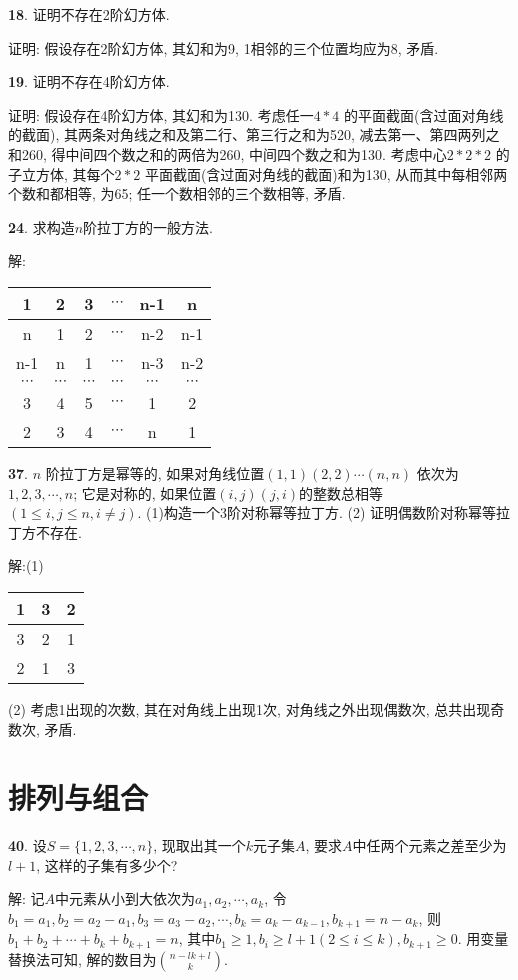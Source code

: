 \documentclass[12pt,a4paper]{article}
\begin{document}
\begin{CJK*}{GBK}{song}
\par \textbf{18}. 证明不存在2阶幻方体.
\par 证明: 假设存在2阶幻方体, 其幻和为9, 1相邻的三个位置均应为8, 矛盾.

\par \textbf{19}. 证明不存在4阶幻方体.
\par 证明: 假设存在4阶幻方体, 其幻和为130. 考虑任一$4*4$ 的平面截面(含过面对角线的截面), 其两条对角线之和及第二行、第三行之和为520, 减去第一、第四两列之和260, 得中间四个数之和的两倍为260, 中间四个数之和为130. 考虑中心$2*2*2$ 的子立方体, 其每个$2*2$ 平面截面(含过面对角线的截面)和为130, 从而其中每相邻两个数和都相等, 为65; 任一个数相邻的三个数相等, 矛盾.

\par \textbf{24}. 求构造$n$阶拉丁方的一般方法.
\par 解:
\begin{tabular}{|c|c|c|c|c|c|}
\hline
1&2&3&$\cdots$&n-1&n\\
\hline
n&1&2&$\cdots$&n-2&n-1\\
\hline
n-1&n&1&$\cdots$&n-3&n-2\\
\hline
$\cdots$&$\cdots$&$\cdots$&$\cdots$&$\cdots$&$\cdots$\\
\hline
3&4&5&$\cdots$&1&2\\
\hline
2&3&4&$\cdots$&n&1\\
\hline
\end{tabular}

\par \textbf{37}. $n$ 阶拉丁方是幂等的, 如果对角线位置$(1,1)(2,2)\cdots(n,n)$ 依次为$1,2,3,\cdots,n$; 它是对称的, 如果位置$(i,j)(j,i)$的整数总相等$(1\le i,j\le n, i\neq j)$. (1)构造一个3阶对称幂等拉丁方. (2) 证明偶数阶对称幂等拉丁方不存在.

\par 解:(1)
\begin{tabular}{|c|c|c|}
\hline
1&3&2\\
\hline
3&2&1\\
\hline
2&1&3\\
\hline
\end{tabular}
(2) 考虑1出现的次数, 其在对角线上出现1次, 对角线之外出现偶数次, 总共出现奇数次, 矛盾.

\section{排列与组合}

\par \textbf{40}. 设$S=\{1,2,3,\cdots,n\}$, 现取出其一个$k$元子集$A$, 要求$A$中任两个元素之差至少为$l+1$, 这样的子集有多少个?
\par 解: 记$A$中元素从小到大依次为$a_1,a_2,\cdots,a_k$, 令$b_1=a_1, b_2=a_2-a_1, b_3=a_3-a_2, \cdots, b_k=a_k-a_{k-1}, b_{k+1}=n-a_k$, 则$b_1+b_2+\cdots+b_k+b_{k+1}=n$, 其中$b_1\ge 1, b_i\ge l+1(2\le i\le k), b_{k+1}\ge 0$. 用变量替换法可知, 解的数目为$\binom{n-lk+l}{k}$.


\end{CJK*}
\end{document}
